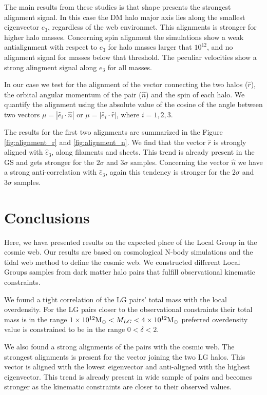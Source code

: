 \documentclass{iau}
\newcommand{\Msun}{{\ifmmode{{\rm {M_{\odot}}}}\else{${\rm{M_{\odot}}}$}\fi}}
\begin{document}
The main results from these studies is that shape presents the
strongest alignment signal. In this case the DM halo major axis lies
along the smallest eigenvector $e_{3}$, regardless of the web
environmet. This alignments is stronger for higher halo
masses. Concerning spin alignment the simulations show a weak
antialignment with respect to $e_{3}$ for halo masses larger that
$10^{12}$\Msun, and no alignment signal for masses below that
threshold. The peculiar velocities show a strong alingment signal
along $e_{3}$ for all masses.


In our case we test for the alignment of the vector connecting the two
halos ($\hat{r}$), the orbital angular momentum of the pair
($\hat{n}$) and the spin of each
halo. We quantify the alignment using the absolute value of the cosine of
the angle between two vectors $\mu=|\hat{e}_i \cdot \hat{n}|$ or
$\mu=|\hat{e}_i\cdot \hat{r}|$, where $i=1,2,3$.  

The results for the first two alignments are summarized in the Figure
\ref{fig:alignment_r} and \ref{fig:alignment_n}.  We find that the
vector $\hat{r}$ is strongly aligned with $\hat{e}_{3}$, along
filaments and sheets. This trend is already present in the GS and gets
stronger for the $2\sigma$ and $3\sigma$ samples. Concerning the
vector $\hat{n}$ we have a strong anti-correlation  with $\hat{e}_3$,
again this tendency is stronger for the $2\sigma$ and $3\sigma$
samples. 


\section{Conclusions}

Here, we hava presented results on the expected place of the Local
Group in the cosmic web. Our results are based on cosmological N-body
simulations and the tidal web method to define the cosmic web. We
constructed different Local Groups samples from dark matter halo pairs
that fulfill observational kinematic constraints. 

We found a tight correlation of the LG pairs' total mass with the
local overdensity. For the LG pairs closer to the observational
constraints their total mass is in the range $1\times 10^{12}\Msun <
M_{LG} < 4\times 10^{12}\Msun$ preferred overdensity value is
constrained to be in the range $0<\delta <2$. 

We also found a strong alignments of the pairs with the cosmic web. The
strongest alignments is present for the vector joining the two LG
halos. This vector is aligned with the lowest eigenvector and
anti-aligned with the highest eigenvector. This trend is already
present in wide sample of pairs and becomes stronger as the kinematic
constraints are closer to their observed values. 
\end{document}
